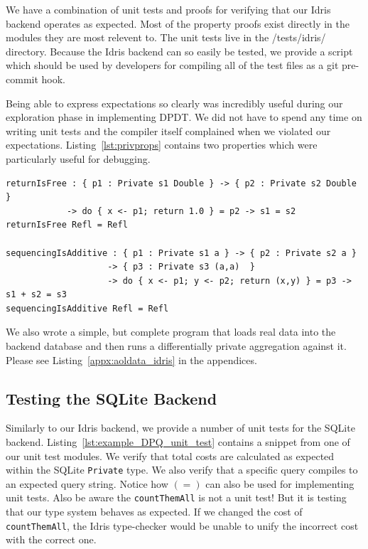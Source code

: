 \documentclass[12pt]{report}
\begin{document}
We have a combination of unit tests and proofs for verifying that our Idris backend operates as expected.
Most of the property proofs exist directly in the modules they are most relevent to.
The unit tests live in the /tests/idris/ directory.
Because the Idris backend can so easily be tested, we provide a script which should be used by developers for compiling all of the test files as a git pre-commit hook.

Being able to express expectations so clearly was incredibly useful during our exploration phase in implementing DPDT.
We did not have to spend any time on writing unit tests and the compiler itself complained when we violated our expectations.
Listing~\ref{lst:privprops} contains two properties which were particularly useful for debugging.

\begin{lstlisting}[float,caption={Properties of \texttt{Private} computation sequencing},label={lst:privprops}]
returnIsFree : { p1 : Private s1 Double } -> { p2 : Private s2 Double }
            -> do { x <- p1; return 1.0 } = p2 -> s1 = s2
returnIsFree Refl = Refl

sequencingIsAdditive : { p1 : Private s1 a } -> { p2 : Private s2 a }
                    -> { p3 : Private s3 (a,a)  }
                    -> do { x <- p1; y <- p2; return (x,y) } = p3 -> s1 + s2 = s3
sequencingIsAdditive Refl = Refl
\end{lstlisting}

We also wrote a simple, but complete program that loads real data into the backend database and then runs a differentially private aggregation against it.
Please see Listing~\ref{appx:aoldata_idris} in the appendices.

\subsection{Testing the SQLite Backend}

Similarly to our Idris backend, we provide a number of unit tests for the SQLite backend.
Listing~\ref{lst:example_DPQ_unit_test} contains a snippet from one of our unit test modules.
We verify that total costs are calculated as expected within the SQLite \texttt{Private} type.
We also verify that a specific query compiles to an expected query string.
Notice how $(=)$ can also be used for implementing unit tests.
Also be aware the \texttt{countThemAll} is not a unit test!
But it is testing that our type system behaves as expected.
If we changed the cost of \texttt{countThemAll}, the Idris type-checker would be unable to unify the incorrect cost with the correct one.
\end{document}
